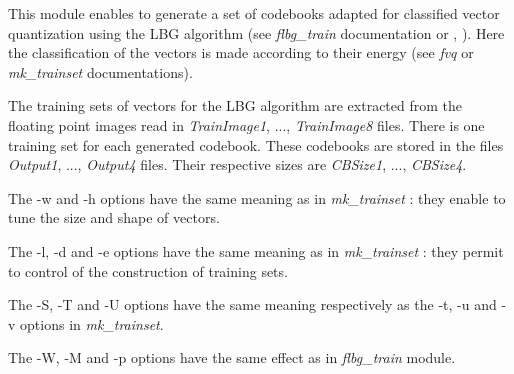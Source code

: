 This module enables to generate a set of codebooks adapted for classified 
vector quantization using the LBG algorithm 
(see {\em flbg\_train} documentation or \cite{gersho.gray:vector}, 
\cite{linde.buzo.ea:algorithm}). 
Here the classification of the vectors is made according to their energy 
(see {\em fvq} or {\em mk\_trainset} documentations). 

The training sets of vectors for the LBG algorithm are extracted from 
the floating point images read in {\em TrainImage1}, ..., {\em TrainImage8} 
files. There is one training set for each generated codebook. 
These codebooks are stored in the files {\em Output1}, ..., {\em Output4} 
files. Their respective sizes are {\em CBSize1}, ..., {\em CBSize4}. 

The -w and -h options have the same meaning as in {\em mk\_trainset} : 
they enable to tune the size and shape of vectors. 

The -l, -d and -e options have the same meaning as in {\em mk\_trainset} : 
they permit to control of the construction of training sets. 

The -S, -T and -U options have the same meaning respectively as the -t, -u 
and -v options in {\em mk\_trainset}.  

The -W, -M and -p options have the same effect as in {\em flbg\_train} 
module. 

